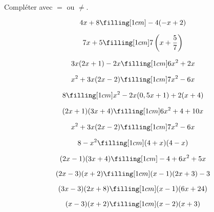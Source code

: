  Compléter avec $=$ ou $\neq$.

\begin{multicols}{3}
     $$4x+8 \filling[1cm] -4(-x+2)$$

     $$7x+5 \filling[1cm] 7\left(x+\frac{5}{7}\right)$$

     $$3x(2x+1) -2x \filling[1cm] 6x^2+2x$$

     $$x^2+3x(2x-2) \filling[1cm] 7x^2-6x$$ 

     $$8 \filling[1cm] x^2-2x(0,5x+1)+2(x+4)$$ 


     $$(2x+1)(3x+4) \filling[1cm] 6x^2+4+10x$$ 

     $$x^2+3x(2x-2) \filling[1cm] 7x^2-6x$$ 

     $$8 -x^2\filling[1cm] (4+x)(4-x)$$ 


     $$(2x-1)(3x+4) \filling[1cm] -4+6x^2+5x$$ 

     $$(2x-3)(x+2) \filling[1cm] (x-1)(2x+3)-3$$ 

     $$(3x-3)(2x+8) \filling[1cm] (x-1)(6x+24)$$


     $$(x-3)(x+2) \filling[1cm] (x-2)(x+3)$$ 
\end{multicols}